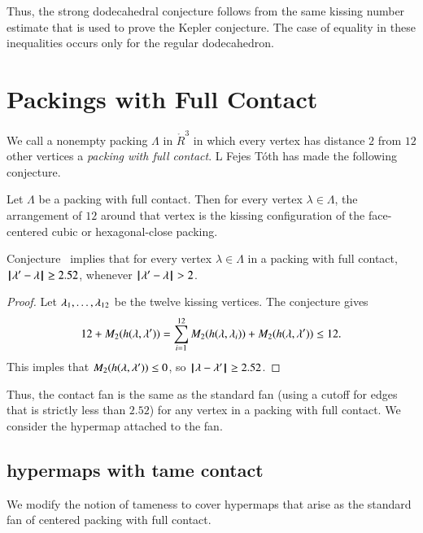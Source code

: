 Thus, the strong dodecahedral conjecture follows from the same kissing number estimate that is used to prove the Kepler conjecture.  The case of equality in these inequalities occurs only for the regular dodecahedron.

\section{Packings with Full Contact}



We call a nonempty packing $\Lambda$ in $\ring{R}^3$ in which every vertex has distance $2$ from  $12$ other vertices a {\it packing with full contact}. L Fejes T\'oth has made the following conjecture.

\begin{conjecture}  Let $\Lambda$ be a packing with full contact.  Then for every vertex $\lambda\in\Lambda$, the arrangement of $12$ around that vertex is the kissing configuration of the face-centered cubic or hexagonal-close packing. 
\end{conjecture}



\begin{lemma}  Conjecture~\label{conj:m2} implies that for every vertex $\lambda\in\Lambda$ in a packing with full contact, ${\hskip0.1em|\hskip-0.15em|\hskip0.1em}\lambda' - \lambda{\hskip0.1em|\hskip-0.15em|\hskip0.1em}\ge 2.52$, whenever ${\hskip0.1em|\hskip-0.15em|\hskip0.1em}\lambda' - \lambda{\hskip0.1em|\hskip-0.15em|\hskip0.1em}> 2$.
\end{lemma}

\begin{proof} Let $\lambda_1,\ldots,\lambda_{12}$ be the twelve kissing vertices.  The conjecture gives
$$
12 + M_2(h(\lambda,\lambda')) = \sum_{i=1}^{12} M_2(h(\lambda,\lambda_i)) + M_2(h(\lambda,\lambda')) \le 12.
$$
This imples that $M_2(h(\lambda,\lambda'))\le 0$, so ${\hskip0.1em|\hskip-0.15em|\hskip0.1em}\lambda - \lambda'{\hskip0.1em|\hskip-0.15em|\hskip0.1em}\ge 2.52$.
\end{proof}

Thus, the contact fan is the same as the standard fan (using a cutoff for edges that is strictly less than $2.52$) for any vertex in a packing with full contact.  We consider the hypermap attached to the fan.


\subsection{hypermaps with tame contact}

We modify the notion of tameness to cover hypermaps that arise as the standard fan of centered packing with full contact.  

